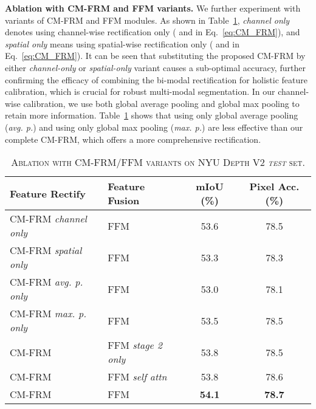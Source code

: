 \documentclass[journal]{IEEEtran}
\begin{document}
\noindent\textbf{Ablation with CM-FRM and FFM variants.}
We further experiment with variants of CM-FRM and FFM modules.
As shown in Table~\ref{tab:ab_study_variants}, \emph{channel only} denotes using channel-wise rectification only ( and  in Eq.~\ref{eq:CM_FRM}), and \emph{spatial only} means using spatial-wise rectification only ( and  in Eq.~\ref{eq:CM_FRM}).
It can be seen that substituting the proposed CM-FRM by either \emph{channel-only} or \emph{spatial-only} variant causes a sub-optimal accuracy, further confirming the efficacy of combining the bi-modal rectification for holistic feature calibration, which is crucial for robust multi-modal segmentation.
In our channel-wise calibration, we use both global average pooling and global max pooling to retain more information. Table~\ref{tab:ab_study_variants} shows that using only global average pooling (\emph{avg. p.}) and using only global max pooling (\emph{max. p.}) are less effective than our complete CM-FRM, which offers a more comprehensive rectification. 
\begin{table}[h]
    \setlength{\tabcolsep}{2.0pt}
    \begin{center}
    \caption{\textsc{Ablation with CM-FRM/FFM variants on NYU Depth V2 \textit{test} set.}}
    \label{tab:ab_study_variants}
    \begin{tabular}{ll|cc}
    \toprule
    \textbf{Feature Rectify} & \textbf{Feature Fusion} & \textbf{mIoU (\%)} & \textbf{Pixel Acc. (\%)} \\
    \midrule\midrule
    \cellcolor{gray!10}CM-FRM \emph{channel only} & FFM & 53.6 & 78.5\\
    \cellcolor{gray!10}CM-FRM \emph{spatial only} & FFM & 53.3 & 78.3\\
    \midrule
    \cellcolor{gray!10}CM-FRM \emph{avg. p. only} & FFM & 53.0 & 78.1\\
    \cellcolor{gray!10}CM-FRM \emph{max. p. only} & FFM & 53.5 & 78.5\\
    \midrule
    CM-FRM & \cellcolor{gray!10}FFM \emph{stage 2 only} & 53.8 & 78.5\\
    CM-FRM & \cellcolor{gray!10}FFM \emph{self attn} & 53.8 & 78.6\\
    \midrule
    CM-FRM & FFM & \textbf{54.1} & \textbf{78.7}\\
    \bottomrule
\end{tabular}     \end{center}
\end{table}
\end{document}
